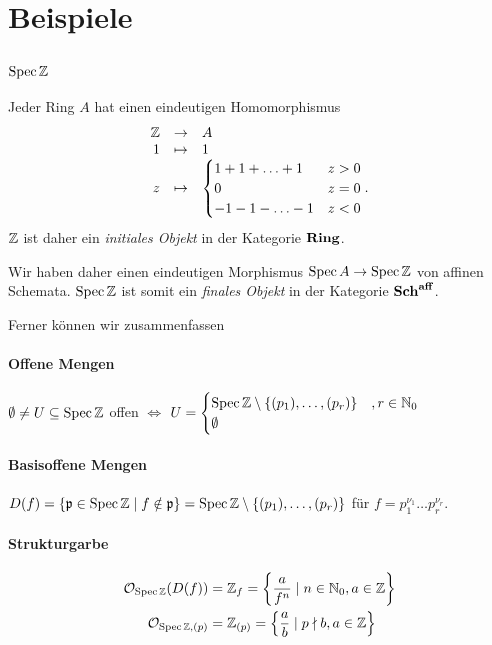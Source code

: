 \section{Beispiele}

\subsection{$\operatorname{Spec} \mathbb{Z}$}

Jeder Ring $A$ hat einen eindeutigen Homomorphismus
\[
	\funcdef{
		\Z & \to & A\\
		 1 & \mapsto & 1\\
		 z & \mapsto & \begin{cases} 1 + 1 + \ldots + 1 & z > 0\\
		 	0 & z = 0\\
		 	-1 -1 - \ldots- 1 & z < 0
		 \end{cases}.}
\]
$\mathbb{Z}$ ist daher ein \emph{initiales Objekt} in der Kategorie $\mathbf{Ring}$.

Wir haben daher einen eindeutigen Morphismus $\operatorname{Spec} A \to \operatorname{Spec} \mathbb{Z}$ von
affinen Schemata. $\operatorname{Spec} \mathbb{Z}$ ist somit ein \emph{finales Objekt} in
der Kategorie $\mathbf{Sch}^{\mathbf{aff}}$.

Ferner können wir zusammenfassen
\paragraph{Offene Mengen}
	$\emptyset \neq U\subseteq \operatorname{Spec} \mathbb{Z}$ offen 
	$\Leftrightarrow$ $U = 
\begin{cases}
  \operatorname{Spec} \mathbb{Z} \setminus \{(p_1),\ldots,(p_r)\} &, r\in \mathbb{N}_0\\
  \emptyset
\end{cases}
$
	
\paragraph{Basisoffene Mengen}
	$D(f) = \{\mathfrak{p} \in \operatorname{Spec}\mathbb{Z} \mid f \notin \mathfrak{p}\} = 
	\operatorname{Spec}\mathbb{Z} \setminus \{(p_1),\ldots,(p_r)\}$ für 
	$f = p_1^{\nu_1}\ldots p_r^{\nu_r}$.
	
\paragraph{Strukturgarbe}
	\begin{align*}
		\mathcal{O}_{\operatorname{Spec}\mathbb{Z}} (D(f)) &= \mathbb{Z}_f  = 
			\left\{ \frac{a}{f^n} \mid n\in \mathbb{N}_0, a\in \mathbb{Z}\right\} \\
		\mathcal{O}_{\operatorname{Spec}\mathbb{Z}, (p)} &= \mathbb{Z}_{(p)} = 
			\left\{ \frac{a}{b} \mid p\nmid b, a\in \mathbb{Z}\right\} 
 	\end{align*}

